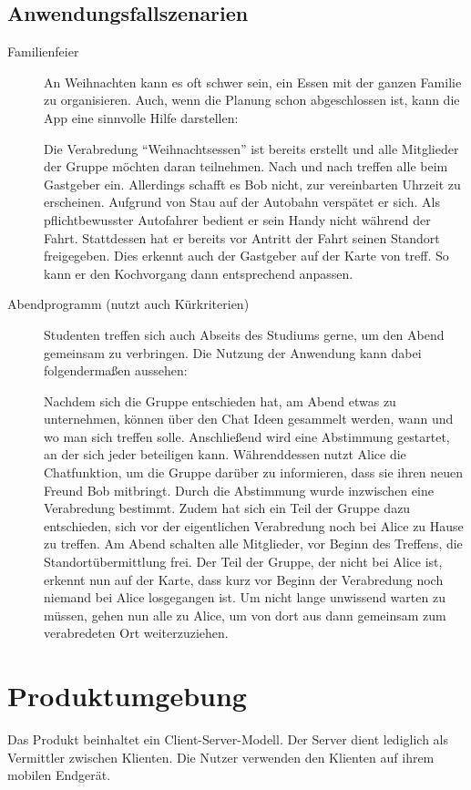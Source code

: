 \documentclass[parskip=full,11pt]{scrartcl}
\begin{document}
\subsection{Anwendungsfallszenarien}
\begin{description}
\item[Familienfeier]
An Weihnachten kann es oft schwer sein, ein Essen mit der ganzen Familie zu organisieren.
Auch, wenn die Planung schon abgeschlossen ist, kann die App eine sinnvolle Hilfe darstellen:

Die Verabredung \enquote{Weihnachtsessen} ist bereits erstellt und alle Mitglieder der Gruppe möchten daran teilnehmen.
Nach und nach treffen alle beim Gastgeber ein. Allerdings schafft es Bob nicht, zur vereinbarten Uhrzeit zu erscheinen.
Aufgrund von Stau auf der Autobahn verspätet er sich.
Als pflichtbewusster Autofahrer bedient er sein Handy nicht während der Fahrt.
Stattdessen hat er bereits vor Antritt der Fahrt seinen Standort freigegeben.
Dies erkennt auch der Gastgeber auf der Karte von treff. So kann er den Kochvorgang dann entsprechend anpassen.

\item[Abendprogramm (nutzt auch Kürkriterien)]
Studenten treffen sich auch Abseits des Studiums gerne, um den Abend gemeinsam zu verbringen.
Die Nutzung der Anwendung kann dabei folgendermaßen aussehen:

Nachdem sich die Gruppe entschieden hat, am Abend etwas zu unternehmen,
können über den Chat Ideen gesammelt werden, wann und wo man sich treffen solle.
Anschließend wird eine Abstimmung gestartet, an der sich jeder beteiligen kann.
Währenddessen nutzt Alice die Chatfunktion, um die Gruppe darüber zu informieren, dass sie ihren neuen Freund Bob mitbringt.
Durch die Abstimmung wurde inzwischen eine Verabredung bestimmt.
Zudem hat sich ein Teil der Gruppe dazu entschieden, sich vor der eigentlichen Verabredung noch bei Alice zu Hause zu treffen.
Am Abend schalten alle Mitglieder, vor Beginn des Treffens, die Standortübermittlung frei.
Der Teil der Gruppe, der nicht bei Alice ist, erkennt nun auf der Karte,
dass kurz vor Beginn der Verabredung noch niemand bei Alice losgegangen ist.
Um nicht lange unwissend warten zu müssen,
gehen nun alle zu Alice, um von dort aus dann gemeinsam zum verabredeten Ort weiterzuziehen.
\end{description}

\pagebreak
\section{Produktumgebung}
Das Produkt beinhaltet ein Client-Server-Modell.
Der Server dient lediglich als Vermittler zwischen Klienten.
Die Nutzer verwenden den Klienten auf ihrem mobilen Endgerät.
\end{document}
